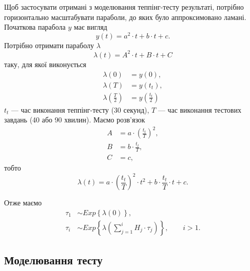 Щоб застосувати отримані з моделювання теппінг-тесту результаті,
потрібно горизонтально масштабувати параболи, до яких було аппроксимовано
ламані.
Початкова парабола $y$ має вигляд
\begin{equation*}
  y \left( t \right) = a^2 \cdot t + b \cdot t + c.
\end{equation*}
Потрібно отримати параболу $\lambda$
\begin{equation*}
  \lambda \left( t \right) = A^2 \cdot t + B \cdot t + C
\end{equation*}
таку, для якої виконується
\begin{equation*}
  \begin{split}
    \lambda\left( 0 \right) &= y\left( 0 \right), \\
    \lambda\left( T \right) &= y\left( t_t \right), \\
    \lambda\left( \frac{T}{2} \right) &= y \left( \frac{t_t}{2} \right)
  \end{split}
\end{equation*}
$t_t$ --- час виконання теппінг-тесту (30 секунд),
$T$ --- час виконання тестових завдань (40 або 90 хвилин).
Маємо розв’язок
\begin{equation*}
  \begin{split}
    A &= a \cdot \left( \frac{t_t}{T} \right)^2, \\
    B &= b \cdot \frac{t_t}{T}, \\
    C &= c,
  \end{split}
\end{equation*}
тобто
\begin{equation*}
  \lambda\left( t \right)
  = a \cdot \left( \frac{t_t}{T} \right)^2 \cdot t^2
    + b \cdot \frac{t_t}{T} \cdot t
    + c.
\end{equation*}

Отже маємо
\begin{equation*}
  \begin{split}
    \tau_1 &\sim Exp\left\{ \lambda\left( 0 \right) \right\}, \\
    \tau_i &\sim
      Exp\left\{ \lambda\left( \sum_{j=1}^{i} H_j \cdot \tau_j \right) \right\},
      \qquad i>1.
  \end{split}
\end{equation*}

\subsection{Моделювання тесту}

